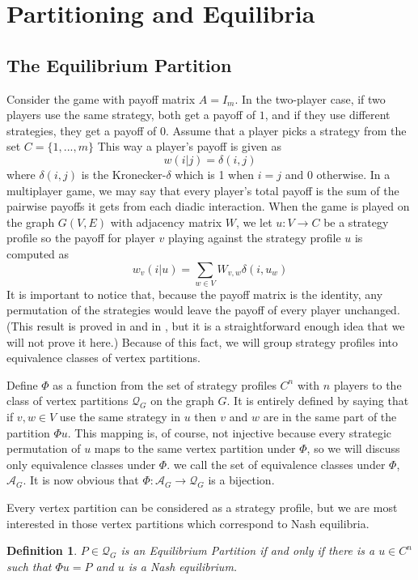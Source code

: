\documentclass{article}
\newtheorem{definition}{Definition}[section]
\begin{document}
\section{Partitioning and Equilibria}\label{sec:paritioning}
\subsection{The Equilibrium Partition}
Consider the game with payoff matrix $A=I_m$. In the two-player case, if two players use the same strategy, both get a payoff of $1$, and if they use different strategies, they get a payoff of $0$. Assume that a player picks a strategy from the set $C=\{1,...,m\}$ This way a player's payoff is given as 
\[w(i|j)=\delta(i,j)\]
where $\delta(i,j)$ is the Kronecker-$\delta$ which is 1 when $i=j$ and $0$ otherwise. In a multiplayer game, we may say that every player's total payoff is the sum of the pairwise payoffs it gets from each diadic interaction. When the game is played on the graph $G(V,E)$ with adjacency matrix $W$, we let $u:V\to C$ be a strategy profile so the payoff for player $v$ playing against the strategy profile $u$ is computed as 
\[w_v(i|u)=\sum_{w\in V}W_{v,w}\delta(i,u_w)\]
It is important to notice that, because the payoff matrix is the identity, any permutation of the strategies would leave the payoff of every player unchanged. (This result is proved in \cite{McAlister2024simulation} and in \cite{McAlister2026}, but it is a straightforward enough idea that we will not prove it here.) Because of this fact, we will group strategy profiles into equivalence classes of vertex partitions.

Define $\Phi$ as a function from the set of strategy profiles $C^n$ with $n$ players to the class of vertex partitions $\mathcal{Q}_G$ on the graph $G$. It is entirely defined by saying that if $v,w\in V$ use the same strategy in $u$ then $v$ and $w$ are in the same part of the partition $\Phi u$. This mapping is, of course, not injective because every strategic permutation of $u$ maps to the same vertex partition under $\Phi$, so we will discuss only equivalence classes under $\Phi$. we call the set of equivalence classes under $\Phi$, $\mathcal{A}_G$. It is now obvious that $\Phi:\mathcal{A}_G\to \mathcal{Q}_G$ is a bijection. 

Every vertex partition can be considered as a strategy profile, but we are most interested in those vertex partitions which correspond to Nash equilibria.
\begin{definition}
    $P\in \mathcal{Q}_G$ is an \textit{Equilibrium Partition} if and only if there is a $u\in C^n$ such that $\Phi u = P$ and $u$ is a Nash equilibrium. 
\end{definition}
\end{document}

